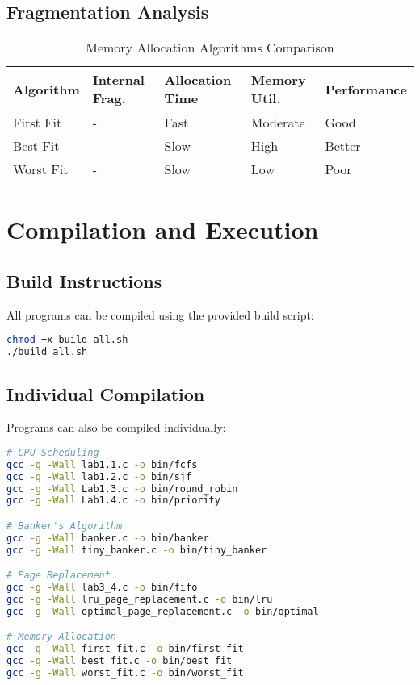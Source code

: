 \documentclass[12pt,a4paper]{article}
\begin{document}
\vspace{3cm}

\subsection{Fragmentation Analysis}

\begin{table}[H]
\centering
\caption{Memory Allocation Algorithms Comparison}
\begin{tabular}{|l|l|l|l|l|}
\hline
\textbf{Algorithm} & \textbf{Internal Frag.} & \textbf{Allocation Time} & \textbf{Memory Util.} & \textbf{Performance} \\
\hline
First Fit & - & Fast & Moderate & Good \\
\hline
Best Fit & - & Slow & High & Better \\
\hline
Worst Fit & - & Slow & Low & Poor \\
\hline
\end{tabular}
\label{tab:memory_allocation_comparison}
\end{table}

\vspace{2cm}

\section{Compilation and Execution}

\subsection{Build Instructions}
All programs can be compiled using the provided build script:

\begin{lstlisting}[language=bash, caption=Build Script Execution]
chmod +x build_all.sh
./build_all.sh
\end{lstlisting}

\subsection{Individual Compilation}
Programs can also be compiled individually:

\begin{lstlisting}[language=bash, caption=Individual Compilation Commands]
# CPU Scheduling
gcc -g -Wall lab1.1.c -o bin/fcfs
gcc -g -Wall lab1.2.c -o bin/sjf
gcc -g -Wall Lab1.3.c -o bin/round_robin
gcc -g -Wall Lab1.4.c -o bin/priority

# Banker's Algorithm
gcc -g -Wall banker.c -o bin/banker
gcc -g -Wall tiny_banker.c -o bin/tiny_banker

# Page Replacement
gcc -g -Wall lab3_4.c -o bin/fifo
gcc -g -Wall lru_page_replacement.c -o bin/lru
gcc -g -Wall optimal_page_replacement.c -o bin/optimal

# Memory Allocation
gcc -g -Wall first_fit.c -o bin/first_fit
gcc -g -Wall best_fit.c -o bin/best_fit
gcc -g -Wall worst_fit.c -o bin/worst_fit
\end{lstlisting}
\end{document}

